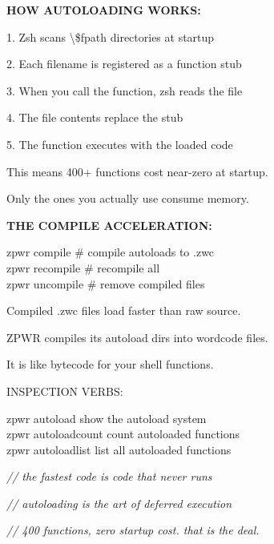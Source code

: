 \documentclass[11pt,a4paper,twoside]{book}
\begin{document}
\vspace{12pt}
{\bfseries\color{neonyellow} HOW AUTOLOADING WORKS:}\vspace{4pt}

1. Zsh scans \textbackslash{}\$fpath directories at startup

2. Each filename is registered as a function stub

3. When you call the function, zsh reads the file

4. The file contents replace the stub

5. The function executes with the loaded code

This means 400+ functions cost near-zero at startup.

Only the ones you actually use consume memory.


\vspace{12pt}
{\bfseries\color{neonyellow} THE COMPILE ACCELERATION:}\vspace{4pt}

\begin{codebox}
zpwr compile       \# compile autoloads to .zwc\\
zpwr recompile     \# recompile all\\
zpwr uncompile     \# remove compiled files\\
\end{codebox}

Compiled .zwc files load faster than raw source.

ZPWR compiles its autoload dirs into wordcode files.

It is like bytecode for your shell functions.

INSPECTION VERBS:

\begin{codebox}
zpwr autoload          show the autoload system\\
zpwr autoloadcount     count autoloaded functions\\
zpwr autoloadlist      list all autoloaded functions\\
\end{codebox}

{\small\itshape\color{dimtext} // the fastest code is code that never runs}

{\small\itshape\color{dimtext} // autoloading is the art of deferred execution}

{\small\itshape\color{dimtext} // 400 functions, zero startup cost. that is the deal.}


\vspace{16pt}
\end{document}
